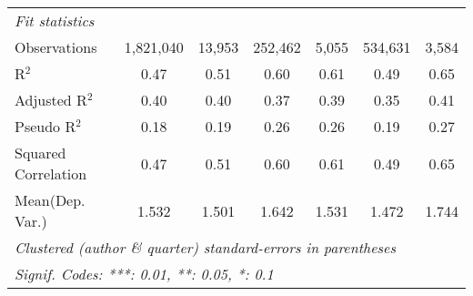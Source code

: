 \begin{tabular}{lcccccc}
   \midrule
   \emph{Fit statistics}\\
   Observations                                               & 1,821,040      & 13,953       & 252,462       & 5,055   & 534,631        & 3,584\\  
   R$^2$                                                      & 0.47           & 0.51         & 0.60          & 0.61    & 0.49           & 0.65\\  
   Adjusted R$^2$                                             & 0.40           & 0.40         & 0.37          & 0.39    & 0.35           & 0.41\\  
   Pseudo R$^2$                                               & 0.18           & 0.19         & 0.26          & 0.26    & 0.19           & 0.27\\  
   Squared Correlation                                        & 0.47           & 0.51         & 0.60          & 0.61    & 0.49           & 0.65\\  
Mean(Dep. Var.) & 1.532 & 1.501 & 1.642 & 1.531 & 1.472 & 1.744 \\
   \midrule \midrule
   \multicolumn{7}{l}{\emph{Clustered (author \& quarter) standard-errors in parentheses}}\\
   \multicolumn{7}{l}{\emph{Signif. Codes: ***: 0.01, **: 0.05, *: 0.1}}\\
\end{tabular}
\par\endgroup
